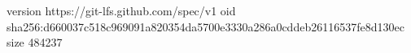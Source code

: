 version https://git-lfs.github.com/spec/v1
oid sha256:d660037c518c969091a820354da5700e3330a286a0cddeb26116537fe8d130ec
size 484237
